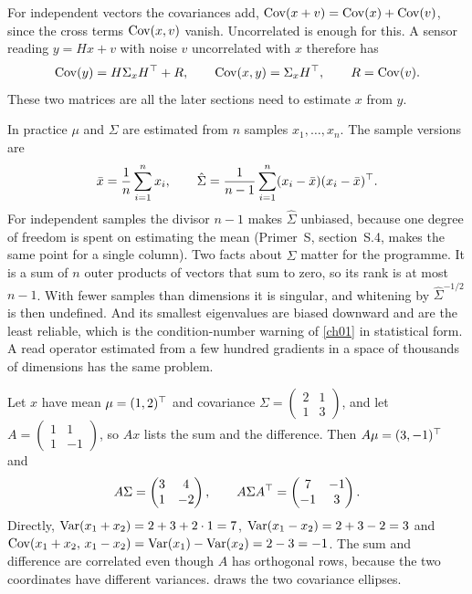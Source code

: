 For independent vectors the covariances add, $\operatorname{Cov}(x+v)=\operatorname{Cov}(x)+\operatorname{Cov}(v)$, since
the cross terms $\operatorname{Cov}(x,v)$ vanish. Uncorrelated is enough for this. A sensor
reading $y=Hx+v$ with noise $v$ uncorrelated with $x$ therefore has
\begin{equation}\label{eq:ch02:sensor}
\operatorname{Cov}(y)=H\Sigma_xH^{\top}+R,\qquad \operatorname{Cov}(x,y)=\Sigma_xH^{\top},\qquad R=\operatorname{Cov}(v).
\end{equation}
These two matrices are all the later sections need to estimate $x$ from $y$.

In practice $\mu$ and $\Sigma$ are estimated from $n$ samples $x_1,\dots,x_n$.
The sample versions are
\begin{equation}\label{eq:ch02:sample}
\bar x=\frac1n\sum_{i=1}^n x_i,\qquad
\hat\Sigma=\frac1{n-1}\sum_{i=1}^n(x_i-\bar x)(x_i-\bar x)^{\top} .
\end{equation}
For independent samples the divisor $n-1$ makes $\hat\Sigma$ unbiased, because one degree of freedom is
spent on estimating the mean (Primer~S, section~S.4, makes the same point for a
single column). Two facts about $\hat\Sigma$ matter for the programme. It is a
sum of $n$ outer products of vectors that sum to zero, so its rank is at most
$n-1$. With fewer samples than dimensions it is singular, and whitening by
$\hat\Sigma^{-1/2}$ is then undefined. And its smallest eigenvalues are biased
downward and are the least reliable, which is the condition-number warning of
\cref{ch01} in statistical form. A read operator estimated from a few hundred
gradients in a space of thousands of dimensions has the same problem.

\begin{example}\label{ex:ch02:linmap}
Let $x$ have mean $\mu=(1,2)^{\top}$ and covariance
$\Sigma=\begin{pmatrix}2&1\\1&3\end{pmatrix}$, and let
$A=\begin{pmatrix}1&1\\1&-1\end{pmatrix}$, so $Ax$ lists the sum and the
difference. Then $A\mu=(3,-1)^{\top}$ and
\[
A\Sigma=\begin{pmatrix}3&4\\1&-2\end{pmatrix},\qquad
A\Sigma A^{\top}=\begin{pmatrix}7&-1\\-1&3\end{pmatrix}.
\]
Directly, $\operatorname{Var}(x_1+x_2)=2+3+2\cdot1=7$, $\operatorname{Var}(x_1-x_2)=2+3-2=3$ and
$\operatorname{Cov}(x_1+x_2,\,x_1-x_2)=\operatorname{Var}(x_1)-\operatorname{Var}(x_2)=2-3=-1$. The sum and difference
are correlated even though $A$ has orthogonal rows, because the two
coordinates have different variances.  draws the two
covariance ellipses.
\end{example}

